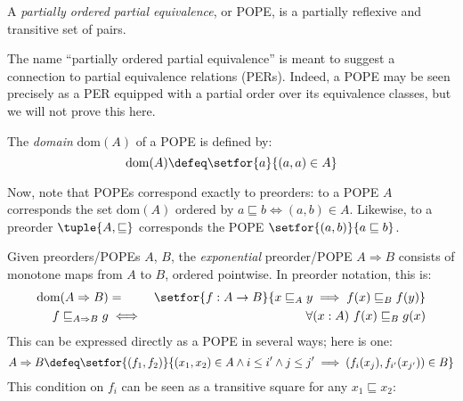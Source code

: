 \documentclass{article}
\newcommand{\ale}{\sqsubseteq}
\newcommand{\dom}[1]{\text{dom}(#1)}
\newcommand{\expope}[2]{#1 \Rightarrow #2}
\newcommand{\ALER}{\arrow[no line]{r}{\rotatebox[origin=c]{0}{\scalebox{1.33}{$\ale$}}}}
\newcommand{\ALED}{\arrow[no line]{d}{\rotatebox[origin=c]{-90}{\scalebox{1.33}{$\ale$}}}}
\begin{document}
\begin{definition}
  A \emph{partially ordered partial equivalence}, or POPE, is a partially
  reflexive and transitive set of pairs.
\end{definition}

The name ``partially ordered partial equivalence'' is meant to suggest a
connection to partial equivalence relations (PERs). Indeed, a POPE may be seen
precisely as a PER equipped with a partial order over its equivalence classes,
but we will not prove this here.

\begin{definition}
  The \emph{domain} $\dom{A}$ of a POPE is defined by:
  \begin{equation*}
    \dom{A} \defeq \setfor{a}{(a,a) \in A}
  \end{equation*}
\end{definition}

Now, note that POPEs correspond exactly to preorders: to a POPE $A$ corresponds
the set $\dom{A}$ ordered by $a \ale b \iff (a,b) \in A$. Likewise, to a
preorder $\tuple{A,\ale}$ corresponds the POPE $\setfor{(a,b)}{a \ale b}$.

\begin{definition}
  Given preorders/POPEs $A$, $B$, the \emph{exponential} preorder/POPE
  $\expope{A}{B}$ consists of monotone maps from $A$ to $B$, ordered pointwise.
  In preorder notation, this is:
  \begin{eqnarray*}
    \dom{\expope{A}{B}} &=& \setfor{f : A \to B}
        {x \ale_A y \implies f(x) \ale_B f(y)}\\
    f \ale_{\expope{A}{B}} g &\iff& \forall(x : A)\ f(x) \ale_B g(x)
  \end{eqnarray*}
  This can be expressed directly as a POPE in several ways; here is one:
  \begin{equation*}
    \expope{A}{B} \defeq
    \setfor{(f_1,f_2)}
           {(x_1, x_2) \in A \wedge i \le i' \wedge j \le j'
             \implies (f_i(x_j), f_{i'}(x_{j'})) \in B}
  \end{equation*}
  This condition on $f_i$ can be seen as a transitive square for any $x_1 \ale
  x_2$:
  \begin{center}
            {}
  \end{center}
\end{definition}
\end{document}
